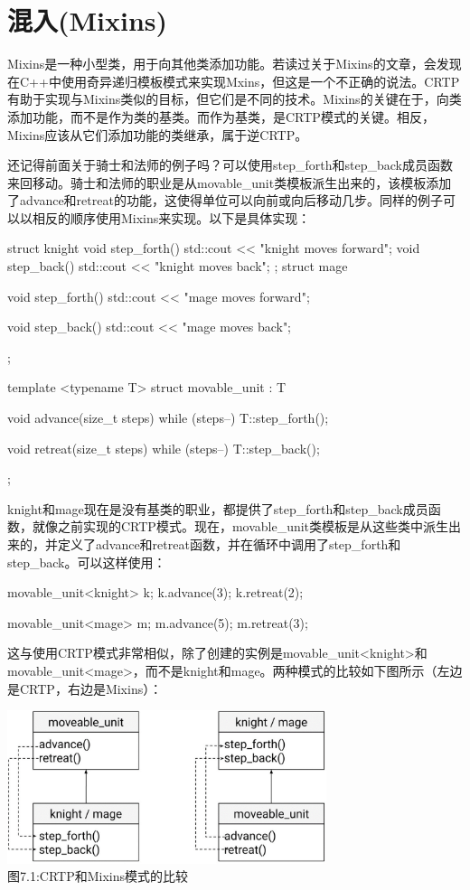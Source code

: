\section{混入(Mixins)}
Mixins是一种小型类，用于向其他类添加功能。若读过关于Mixins的文章，会发现在C++中使用奇异递归模板模式来实现Mxins，但这是一个不正确的说法。CRTP有助于实现与Mixins类似的目标，但它们是不同的技术。Mixins的关键在于，向类添加功能，而不是作为类的基类。而作为基类，是CRTP模式的关键。相反，Mixins应该从它们添加功能的类继承，属于逆CRTP。

还记得前面关于骑士和法师的例子吗？可以使用step_forth和step_back成员函数来回移动。骑士和法师的职业是从movable_unit类模板派生出来的，该模板添加了advance和retreat的功能，这使得单位可以向前或向后移动几步。同样的例子可以以相反的顺序使用Mixins来实现。以下是具体实现：

\begin{cppcode}
struct knight
{
	void step_forth()
	{
		std::cout << "knight moves forward\n";
	}
	void step_back()
	{
		std::cout << "knight moves back\n";
	}
};
struct mage
{
	void step_forth()
	{
		std::cout << "mage moves forward\n";
	}

	void step_back()
	{
		std::cout << "mage moves back\n";
	}
};

template <typename T>
struct movable_unit : T
{
	void advance(size_t steps)
	{
		while (steps--)
			T::step_forth();
	}

	void retreat(size_t steps)
	{
		while (steps--)
			T::step_back();
	}
};
\end{cppcode}

knight和mage现在是没有基类的职业，都提供了step_forth和step_back成员函数，就像之前实现的CRTP模式。现在，movable_unit类模板是从这些类中派生出来的，并定义了advance和retreat函数，并在循环中调用了step_forth和step_back。可以这样使用：

\begin{cppcode}
movable_unit<knight> k;
k.advance(3);
k.retreat(2);

movable_unit<mage> m;
m.advance(5);
m.retreat(3);
\end{cppcode}

这与使用CRTP模式非常相似，除了创建的实例是movable_unit<knight>和movable_unit<mage>，而不是knight和mage。两种模式的比较如下图所示（左边是CRTP，右边是Mixins）：

\begin{center}
\includegraphics[width=0.7\textwidth]{images/1.png}\\
图7.1:CRTP和Mixins模式的比较
\end{center}

